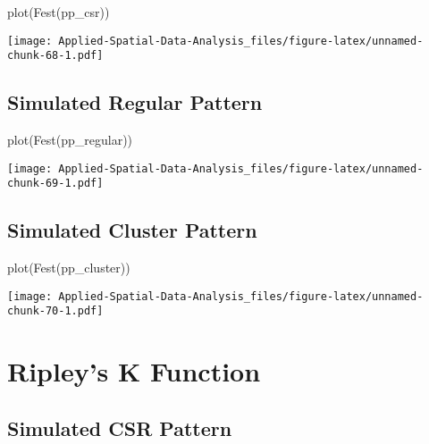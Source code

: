 \documentclass[
]{book}
\newenvironment{Shaded}{\begin{snugshade}}{\end{snugshade}}
\newcommand{\FunctionTok}[1]{\textcolor[rgb]{0.00,0.00,0.00}{#1}}
\newcommand{\NormalTok}[1]{#1}
\begin{document}
\begin{Shaded}
\begin{Highlighting}[]
\FunctionTok{plot}\NormalTok{(}\FunctionTok{Fest}\NormalTok{(pp\_csr))}
\end{Highlighting}
\end{Shaded}

\texttt{[image: Applied-Spatial-Data-Analysis\_files/figure-latex/unnamed-chunk-68-1.pdf]}

\hypertarget{simulated-regular-pattern-3}{%
\subsection{Simulated Regular Pattern}\label{simulated-regular-pattern-3}}

\begin{Shaded}
\begin{Highlighting}[]
\FunctionTok{plot}\NormalTok{(}\FunctionTok{Fest}\NormalTok{(pp\_regular))}
\end{Highlighting}
\end{Shaded}

\texttt{[image: Applied-Spatial-Data-Analysis\_files/figure-latex/unnamed-chunk-69-1.pdf]}

\hypertarget{simulated-cluster-pattern-3}{%
\subsection{Simulated Cluster Pattern}\label{simulated-cluster-pattern-3}}

\begin{Shaded}
\begin{Highlighting}[]
\FunctionTok{plot}\NormalTok{(}\FunctionTok{Fest}\NormalTok{(pp\_cluster))}
\end{Highlighting}
\end{Shaded}

\texttt{[image: Applied-Spatial-Data-Analysis\_files/figure-latex/unnamed-chunk-70-1.pdf]}

\hypertarget{ripleys-k-function}{%
\section{Ripley's K Function}\label{ripleys-k-function}}

\hypertarget{simulated-csr-pattern-4}{%
\subsection{Simulated CSR Pattern}\label{simulated-csr-pattern-4}}
\end{document}

